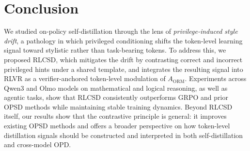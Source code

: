 \section{Conclusion}
\label{sec:conclusion}

We studied on-policy self-distillation through the lens of \emph{privilege-induced style drift}, a pathology in which privileged conditioning shifts the token-level learning signal toward stylistic rather than task-bearing tokens. To address this, we proposed RLCSD, which mitigates the drift by contrasting correct and incorrect privileged hints under a shared template, and integrates the resulting signal into RLVR as a verifier-anchored token-level modulation of $A_{\mathrm{ORM}}$. Experiments across Qwen3 and Olmo models on mathematical and logical reasoning, as well as agentic tasks, show that RLCSD consistently outperforms GRPO and prior OPSD methods while maintaining stable training dynamics. Beyond RLCSD itself, our results show that the contrastive principle is general: it improves existing OPSD methods and offers a broader perspective on how token-level distillation signals should be constructed and interpreted in both self-distillation and cross-model OPD.

